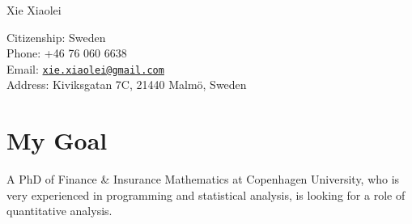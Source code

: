 \documentclass[10pt,letterpaper]{article}
\def\name{Xie Xiaolei}
\begin{document}
{\huge Xie Xiaolei}


\vspace{0.25in}

\begin{minipage}[t]{0.5\textwidth}
  Citizenship: Sweden \\
  Phone: +46 76 060 6638 \\
  Email: \href{mailto:xie.xiaolei@gmail.com}{\tt xie.xiaolei@gmail.com} \\
  Address: Kiviksgatan 7C, 21440 Malm\"{o}, Sweden
\end{minipage}

\section*{My Goal}
A PhD of Finance \& Insurance Mathematics at Copenhagen
University, who is very experienced in programming and statistical
analysis,
is looking for a role of quantitative analysis.
\end{document}
